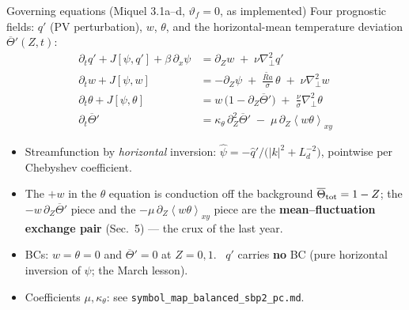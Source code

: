 \documentclass[aspectratio=169,10pt]{beamer}
\newcommand{\Rat}{\widetilde{Ra}}
\newcommand{\Ld}{L_d}
\newcommand{\Jac}[2]{J\!\left[#1,#2\right]}
\newcommand{\Tb}{\overline{\Theta}}
\newcommand{\avexy}[1]{\left\langle #1 \right\rangle_{xy}}
\newcommand{\dZ}{\partial_Z}
\newcommand{\lapp}{\nabla_{\!\perp}^{2}}
\newcommand{\file}[1]{\textcolor{blue!60!black}{\texttt{#1}}}
\begin{document}
\begin{frame}{Governing equations (Miquel 3.1a--d, $\vartheta_f=0$, as implemented)}
  Four prognostic fields: $q'$ (PV perturbation), $w$, $\theta$, and the horizontal-mean
  temperature deviation $\Tb'(Z,t)$:
  \begin{align*}
    \partial_t q' + \Jac{\psi}{q'} + \beta\,\partial_x\psi
      &= \dZ w \;+\; \nu\lapp q' \\
    \partial_t w + \Jac{\psi}{w}
      &= -\dZ \psi \;+\; \tfrac{\Rat}{\sigma}\,\theta \;+\; \nu\lapp w \\
    \partial_t \theta + \Jac{\psi}{\theta}
      &= w\,\bigl(1 - \dZ\Tb'\bigr) \;+\; \tfrac{\nu}{\sigma}\lapp\theta \\
    \partial_t \Tb'
      &= \kappa_\theta\, \dZ^2 \Tb' \;-\; \mu\,\dZ\avexy{w\theta}
  \end{align*}
  \begin{itemize}
    \item Streamfunction by \emph{horizontal} inversion:
      $\hat\psi = -\hat q' / \bigl(|k|^2 + \Ld^{-2}\bigr)$, pointwise per Chebyshev coefficient.
    \item The $+w$ in the $\theta$ equation is conduction off the background $\Tb_{\rm tot}=1-Z$;
      the $-w\,\dZ\Tb'$ piece and the $-\mu\,\dZ\avexy{w\theta}$ piece are the
      \textbf{mean--fluctuation exchange pair} (Sec.~5) --- the crux of the last year.
    \item BCs: $w=\theta=0$ and $\Tb'=0$ at $Z=0,1$. \ $q'$ carries \textbf{no} BC
      (pure horizontal inversion of $\psi$; the March lesson).
    \item Coefficients $\mu,\kappa_\theta$: see \file{symbol\_map\_balanced\_sbp2\_pc.md}.
  \end{itemize}
\end{frame}
\end{document}

